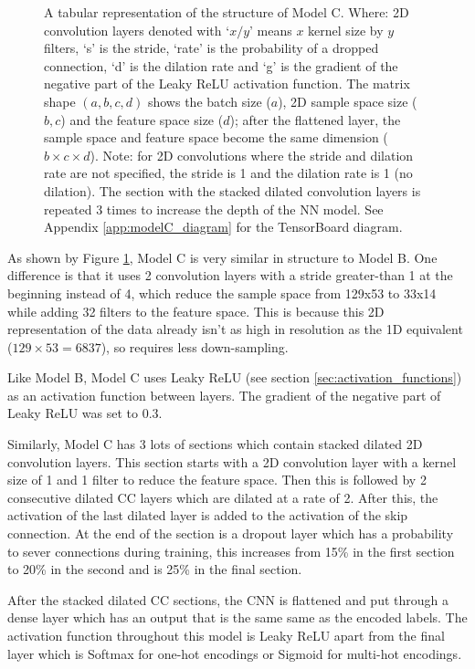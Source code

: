 \documentclass[12pt]{article}
\begin{document}
\begin{figure}[H]
        \caption{\footnotesize{A tabular representation of the structure of Model C. Where: 2D convolution layers denoted with `$x/y$' means $x$ kernel size by $y$ filters, `s' is the stride, `rate' is the probability of a dropped connection, `d' is the dilation rate and `g' is the gradient of the negative part of the Leaky ReLU activation function. The matrix shape $(a, b, c, d)$ shows the batch size ($a$), 2D sample space size ($b, c$) and the feature space size ($d$); after the flattened layer, the sample space and feature space become the same dimension ($b \times c \times d$). Note: for 2D convolutions where the stride and dilation rate are not specified, the stride is 1 and the dilation rate is 1 (no dilation). The section with the stacked dilated convolution layers is repeated 3 times to increase the depth of the NN model. See Appendix \ref{app:modelC_diagram} for the TensorBoard diagram.}}
        \label{fig:modelC_structure}
    \end{figure}
    
    As shown by Figure \ref{fig:modelC_structure}, Model C is very similar in structure to Model B. One difference is that it uses 2 convolution layers with a stride greater-than 1 at the beginning instead of 4, which reduce the sample space from 129x53 to 33x14 while adding 32 filters to the feature space. This is because this 2D representation of the data already isn't as high in resolution as the 1D equivalent ($129\times 53 = 6837$), so requires less down-sampling.\medskip
    
    Like Model B, Model C uses Leaky ReLU (see section \ref{sec:activation_functions}) as an activation function between layers. The gradient of the negative part of Leaky ReLU was set to 0.3.\medskip
    
    Similarly, Model C has 3 lots of sections which contain stacked dilated 2D convolution layers. This section starts with a 2D convolution layer with a kernel size of 1 and 1 filter to reduce the feature space. Then this is followed by 2 consecutive dilated CC layers which are dilated at a rate of 2. After this, the activation of the last dilated layer is added to the activation of the skip connection. At the end of the section is a dropout layer which has a probability to sever connections during training, this increases from 15\% in the first section to 20\% in the second and is 25\% in the final section.\medskip
    
    After the stacked dilated CC sections, the CNN is flattened and put through a dense layer which has an output that is the same same as the encoded labels. The activation function throughout this model is Leaky ReLU apart from the final layer which is Softmax for one-hot encodings or Sigmoid for multi-hot encodings.
    
\end{document}
